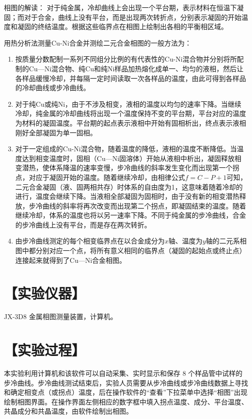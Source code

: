 \documentclass[a4paper,utf8]{article}
\begin{document}
相图的解读： 对于纯金属，冷却曲线上会出现一个平台期，表示材料在恒温下凝固；而对于合金，曲线上没有平台，而是出现两次转折点，分别表示凝固的开始温度和凝固的终结温度。根据这些临界点在相图上绘制出各相的平衡相区域。    

用热分析法测量Cu-Ni合金并测绘二元合金相图的一般方法为：

\begin{enumerate}
    \item 按质量分数配制一系列不同组分比例的有代表性的Cu-Ni混合物并分别将所配制的Cu—Ni混合物、纯Cu和纯Ni样品加热熔化成单一、均匀的液相，然后让各样品缓慢冷却，并每隔一定时间读取一次各样品的温度，由此可得到各样品的冷却曲线或步冷曲线。
    \item 对于纯Cu或纯Ni，由于不涉及相变，液相的温度以均匀的速率下降。当继续冷却，纯金属的冷却曲线将出现一个温度保持不变的平台期，平台对应的温度为材料的凝固温度。平台期的起点表示液相中开始有固相析出，终点表示液相刚好全部凝固为单一固相。
    \item 对于一定组成的Cu-Ni混合物，随着温度的降低，液相的温度不断降低。当温度达到相变温度时，固相（Cu—Ni固溶体）开始从液相中析出，凝固释放相变潜热，使体系降温的速率变慢，步冷曲线的斜率发生变化而出现第一个拐点，对应于凝固开始的温度。随着继续冷却，由相律公式$f=C-P+1$可知，二元合金凝固（液、固两相共存）时体系的自由度为1，这意味着随着冷却的进行，温度会继续下降。当液相全部凝固为固相时，由于没有新的相变潜热释放，步冷曲线的斜率将再次改变而出现第二个拐点，即凝固结束的温度。随着继续冷却，体系的温度也将以另一速率下降。不同于纯金属的步冷曲线，合金的步冷曲线上没有平台，而是存在两次转折。
    \item 由步冷曲线测定的每个相变临界点在以合金成分为$x$轴、温度为$y$轴的二元系相图中都分别对应一个点，将所有意义相同的临界点（凝固的起始点或终止点）连接起来就得到了Cu—Ni合金相图。
\end{enumerate}

\section*{【实验仪器】}%
    JX-3D8 金属相图测量装置，计算机。

\section*{【实验过程】} %

本实验利用计算机和该软件可以自动采集、实时显示和保存 8 个样品管中试样的步冷曲线。步冷曲线测试结束后，实验人员需要从步冷曲线或步冷曲线数据上寻找和确定相变点（或拐点）温度，后在操作软件的“查看”下拉菜单中选择“相图”出现绘制相图界面。在操作界面左侧相应的数字框中填入拐点温度、成分、平台温度、共晶成分和共晶温度，由软件绘制出相图。
\end{document}
